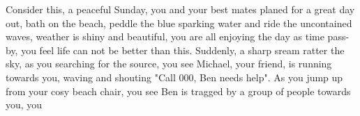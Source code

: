 Consider this, a peaceful Sunday, you and your best mates planed for a great day out, bath on the beach, peddle the blue sparking water and ride the uncontained waves, weather is shiny and beautiful, you are all enjoying the day as time pass-by, you feel life can not be better than this. Suddenly, a sharp sream ratter the sky, as you searching for the source, you see Michael, your friend, is running towards you, waving and shouting "Call 000, Ben needs help". As you jump up from your cosy beach chair, you see Ben is tragged by a group of people towards you, you 
